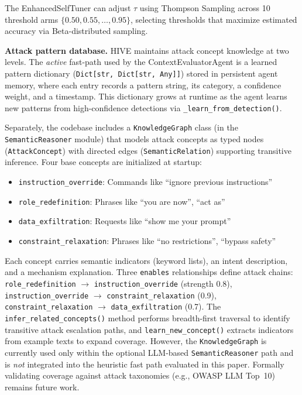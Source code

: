 \documentclass[manuscript,screen,review]{acmart}
\begin{document}
The EnhancedSelfTuner can adjust $\tau$ using Thompson Sampling across 10 threshold arms $\{0.50, 0.55, \ldots, 0.95\}$, selecting thresholds that maximize estimated accuracy via Beta-distributed sampling.

\textbf{Attack pattern database.} HIVE maintains attack concept knowledge at two levels. The \emph{active} fast-path used by the ContextEvaluatorAgent is a learned pattern dictionary (\texttt{Dict[str, Dict[str, Any]]}) stored in persistent agent memory, where each entry records a pattern string, its category, a confidence weight, and a timestamp. This dictionary grows at runtime as the agent learns new patterns from high-confidence detections via \texttt{\_learn\_from\_detection()}.

Separately, the codebase includes a \texttt{KnowledgeGraph} class (in the \texttt{SemanticReasoner} module) that models attack concepts as typed nodes (\texttt{AttackConcept}) with directed edges (\texttt{SemanticRelation}) supporting transitive inference. Four base concepts are initialized at startup:
\begin{itemize}
\item \texttt{instruction\_override}: Commands like ``ignore previous instructions''
\item \texttt{role\_redefinition}: Phrases like ``you are now'', ``act as''
\item \texttt{data\_exfiltration}: Requests like ``show me your prompt''
\item \texttt{constraint\_relaxation}: Phrases like ``no restrictions'', ``bypass safety''
\end{itemize}
Each concept carries semantic indicators (keyword lists), an intent description, and a mechanism explanation. Three \texttt{enables} relationships define attack chains: \texttt{role\_redefinition} $\to$ \texttt{instruction\_override} (strength 0.8), \texttt{instruction\_override} $\to$ \texttt{constraint\_relaxation} (0.9), \texttt{constraint\_relaxation} $\to$ \texttt{data\_exfiltration} (0.7). The \texttt{infer\_related\_concepts()} method performs breadth-first traversal to identify transitive attack escalation paths, and \texttt{learn\_new\_concept()} extracts indicators from example texts to expand coverage. However, the \texttt{KnowledgeGraph} is currently used only within the optional LLM-based \texttt{SemanticReasoner} path and is \emph{not} integrated into the heuristic fast path evaluated in this paper. Formally validating coverage against attack taxonomies (e.g., OWASP LLM Top~10) remains future work.
\end{document}
